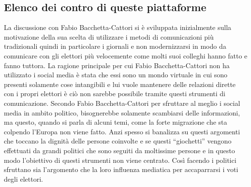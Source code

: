 \subsection{Elenco dei contro di queste piattaforme}
La discussione con Fabio Bacchetta-Cattori si è sviluppata inizialmente sulla motivazione della sua scelta di utilizzare i metodi di comunicazioni più tradizionali quindi in particolare i giornali e non modernizzarsi in modo da comunicare con gli elettori più velocemente come molti suoi colleghi hanno fatto e fanno tuttora. La ragione principale per cui Fabio Bacchetta-Cattori non ha utilizzato i social media è stata che essi sono un mondo virtuale in cui sono presenti solamente cose intangibili e lui vuole mantenere delle relazioni dirette con i propri elettori è ciò non sarebbe possibile tramite questi strumenti di comunicazione. Secondo Fabio Bacchetta-Cattori per sfruttare al meglio i social media in ambito politico, bisognerebbe solamente scambiarsi delle informazioni, ma questo, quando si parla di alcuni temi, come la forte migrazione che sta colpendo l’Europa non viene fatto. Anzi spesso si banalizza su questi argomenti che toccano la dignità delle persone coinvolte e se questi “giochetti” vengono effettuati da grandi politici che sono seguiti da moltissime persone e in questo modo l’obiettivo di questi strumenti non viene centrato. Così facendo i politici sfruttano sia l’argomento che la loro influenza mediatica per accaparrarsi i voti degli elettori.
